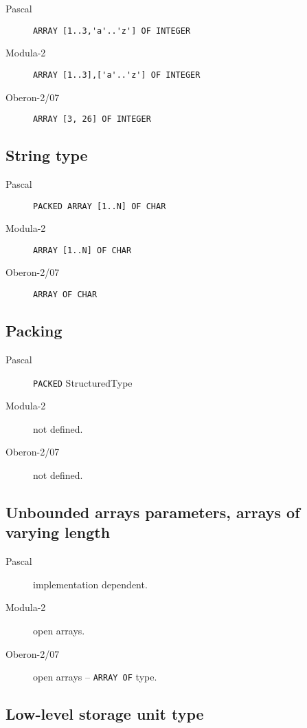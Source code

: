\documentclass[10pt]{article}
\begin{document}
\begin{description}
    \item[Pascal] \lstinline!ARRAY [1..3,'a'..'z'] OF INTEGER!
    \item[Modula-2] \lstinline!ARRAY [1..3],['a'..'z'] OF INTEGER!
    \item[Oberon-2/07] \lstinline!ARRAY [3, 26] OF INTEGER!
\end{description}

\subsection{String type}

\begin{description}
    \item[Pascal] \lstinline!PACKED ARRAY [1..N] OF CHAR!
    \item[Modula-2] \lstinline!ARRAY [1..N] OF CHAR!
    \item[Oberon-2/07] \lstinline!ARRAY OF CHAR!
\end{description}

\subsection{Packing}

\begin{description}
    \item[Pascal] \lstinline!PACKED! StructuredType
    \item[Modula-2] not defined.
    \item[Oberon-2/07] not defined.
\end{description}

\subsection{Unbounded arrays parameters, arrays of varying length}

\begin{description}
    \item[Pascal] implementation dependent.
    \item[Modula-2] open arrays.
    \item[Oberon-2/07] open arrays -- \lstinline!ARRAY OF! type.
\end{description}

\subsection{Low-level storage unit type}
\end{document}
